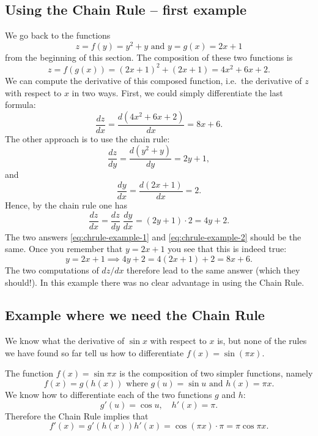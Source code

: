 \subsection{Using the Chain Rule -- first example} 
We go back to the functions
\[
z=f(y) = y^{2}+y \text{ and } y = g(x) = 2x+1
\]
from the beginning of this section. The composition of these two
functions is
\[
z=f(g(x)) = (2x+1)^{2}+(2x+1) = 4x^{2}+6x+2.
\]
We can compute the derivative of this composed function, i.e.\ the
derivative of $z$ with respect to $x$ in two ways.  First, we could simply
differentiate the last formula:
\begin{equation}\label{eq:chrule-example-1}
  \frac{dz}{dx} = \frac{d(4x^{2}+6x+2)}{dx} = 8x+6.
\end{equation}
The other approach is to use the chain rule:
\[
\frac{dz}{dy} = \frac{d(y^2+y)}{dy} = 2y+1,
\]
and
\[
\frac{dy}{dx} = \frac{d(2x+1)}{dx} = 2.
\]
Hence, by the chain rule one has
\begin{equation}\label{eq:chrule-example-2}
  \frac{dz}{dx} = \frac{dz}{dy} \; \frac{dy}{dx} = (2y+1)\cdot 2 = 4y+2.
\end{equation}
The two answers \eqref{eq:chrule-example-1} and
\eqref{eq:chrule-example-2} should be the same.  Once you remember
that $y=2x+1$ you see that this is indeed true:
\[
y=2x+1 \implies 4y+2 = 4(2x+1) + 2= 8x+6.
\]
The two computations of $dz/dx$ therefore lead to the same answer (which they should!).  In
this example there was no clear advantage in using the Chain Rule.
  


\subsection{Example where we need the Chain Rule} 
We know what the derivative of $\sin x$ with respect to $x$ is, but
none of the rules we have found so far tell us how to differentiate
$f(x) = \sin(\pi x)$.




The function $f(x) = \sin \pi x$ is the composition of two simpler
functions, namely
\[
f(x) = g(h(x)) \text{ where }
g(u) = \sin u\text{ and } h(x) = \pi x.
\]
We know how to differentiate each of the two functions $g$ and $h$:
\[
g'(u) = \cos u, \quad h'(x) = \pi.
\]
Therefore the Chain Rule implies that
\[
f'(x) = g'(h(x))h'(x) = \cos(\pi x)\cdot \pi = \pi \cos \pi x.
\]


